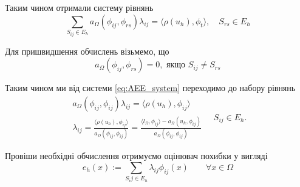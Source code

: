 Таким чином отримали систему рівнянь
%
\begin{equation}\label{eq:AEE_system}
	\sum \limits_{S_{ij} \in E_h} a_\Omega(\phi_{ij}, \phi_{rs}) \lambda_{ij} = \langle \rho(u_h), \phi_t \rangle, \quad S_{rs} \in E_h
\end{equation}

Для пришвидшення обчислень візьмемо, що
%
\begin{equation}
	a_\Omega(\phi_{ij}, \phi_{rs}) = 0, \text{ якщо } S_{ij} \ne S_{rs}
\end{equation}

Таким чином ми від системи \eqref{eq:AEE_system} переходимо до набору рівнянь
%
\begin{equation}
	\begin{split}
		a_\Omega(\phi_{ij}, \phi_{ij}) \lambda_{ij} = \langle \rho(u_h), \phi_{ij} \rangle\\
		\lambda_{ij} = \frac{\langle \rho(u_h), \phi_{ij} \rangle}{a_\Omega(\phi_{ij}, \phi_{ij})}
			= \frac{\langle l_\Omega, \phi_{ij}\rangle - a_\Omega(u_h, \phi_{ij})}{a_\Omega(\phi_{ij}, \phi_{ij})}
	\end{split}
	\quad S_{ij} \in E_h.
\end{equation}

Провіши необхідні обчислення отримуємо оцінювач похибки у вигляді
\begin{equation}\label{eq:AEE_final}
	e_h(x) := \sum \limits_{S_ij \in E_h} \lambda_{ij} \phi_{ij}(x) \qquad \forall x \in \Omega
\end{equation}

